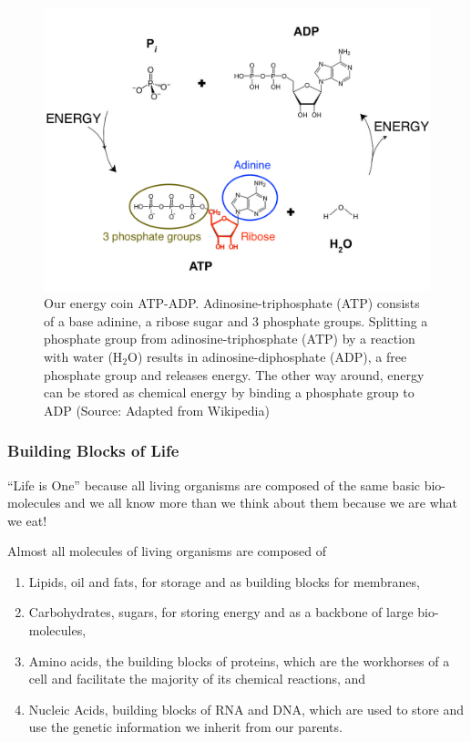 \documentclass[
  11pt,
]{book}
\providecommand{\tightlist}{%
  \setlength{\itemsep}{0pt}\setlength{\parskip}{0pt}}
\begin{document}
\begin{figure}

{\centering \includegraphics[width=0.7\linewidth]{./figs/ATP-ADP} 

}

\caption{Our energy coin ATP-ADP. Adinosine-triphosphate (ATP) consists of a base adinine, a ribose sugar and 3 phosphate groups. Splitting a phosphate group from adinosine-triphosphate (ATP) by a reaction with water (H\(_2\)O) results in adinosine-diphosphate (ADP), a free phosphate group and releases energy. The other way around, energy can be stored as chemical energy by binding a phosphate group to ADP (Source: Adapted from Wikipedia)}\label{fig:atp-adp}
\end{figure}

\pagebreak

\hypertarget{building-blocks-of-life}{%
\subsubsection{Building Blocks of Life}\label{building-blocks-of-life}}

``Life is One'' because all living organisms are composed of the same basic bio-molecules and we all know more than we think about them because we are what we eat!

Almost all molecules of living organisms are composed of

\begin{enumerate}
\def\labelenumi{\arabic{enumi}.}
\tightlist
\item
  Lipids, oil and fats, for storage and as building blocks for membranes,
\item
  Carbohydrates, sugars, for storing energy and as a backbone of large bio-molecules,
\item
  Amino acids, the building blocks of proteins, which are the workhorses of a cell and facilitate the majority of its chemical reactions, and
\item
  Nucleic Acids, building blocks of RNA and DNA, which are used to store and use the genetic information we inherit from our parents.
\end{enumerate}
\end{document}
